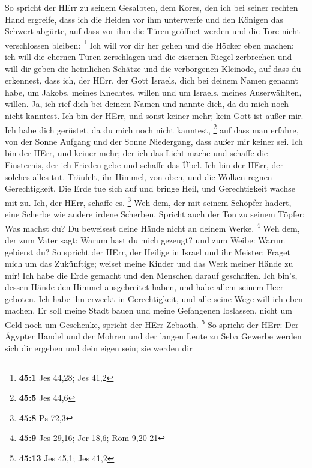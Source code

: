  So spricht der HErr zu seinem Gesalbten, dem Kores, den ich
bei seiner rechten Hand ergreife, dass ich die Heiden vor ihm unterwerfe
und den Königen das Schwert abgürte, auf dass vor ihm die Türen geöffnet
werden und die Tore nicht verschlossen bleiben: \footnote{\textbf{45:1}
  Jes 44,28; Jes 41,2}  Ich will vor dir her gehen und die
Höcker eben machen; ich will die ehernen Türen zerschlagen und die
eisernen Riegel zerbrechen  und will dir geben die
heimlichen Schätze und die verborgenen Kleinode, auf dass du erkennest,
dass ich, der HErr, der Gott Israels, dich bei deinem Namen genannt
habe,  um Jakobs, meines Knechtes, willen und um Israels,
meines Auserwählten, willen. Ja, ich rief dich bei deinem Namen und
nannte dich, da du mich noch nicht kanntest.  Ich bin der
HErr, und sonst keiner mehr; kein Gott ist außer mir. Ich habe dich
gerüstet, da du mich noch nicht kanntest, \footnote{\textbf{45:5} Jes
  44,6}  auf dass man erfahre, von der Sonne Aufgang und der
Sonne Niedergang, dass außer mir keiner sei. Ich bin der HErr, und
keiner mehr;  der ich das Licht mache und schaffe die
Finsternis, der ich Frieden gebe und schaffe das Übel. Ich bin der HErr,
der solches alles tut.  Träufelt, ihr Himmel, von oben, und
die Wolken regnen Gerechtigkeit. Die Erde tue sich auf und bringe Heil,
und Gerechtigkeit wachse mit zu. Ich, der HErr, schaffe es. \footnote{\textbf{45:8}
  Ps 72,3}  Weh dem, der mit seinem Schöpfer hadert, eine
Scherbe wie andere irdene Scherben. Spricht auch der Ton zu seinem
Töpfer: Was machst du? Du beweisest deine Hände nicht an deinem Werke.
\footnote{\textbf{45:9} Jes 29,16; Jer 18,6; Röm 9,20-21} 
Weh dem, der zum Vater sagt: Warum hast du mich gezeugt? und zum Weibe:
Warum gebierst du?  So spricht der HErr, der Heilige in
Israel und ihr Meister: Fraget mich um das Zukünftige; weiset meine
Kinder und das Werk meiner Hände zu mir!  Ich habe die Erde
gemacht und den Menschen darauf geschaffen. Ich bin's, dessen Hände den
Himmel ausgebreitet haben, und habe allem seinem Heer geboten.
 Ich habe ihn erweckt in Gerechtigkeit, und alle seine Wege
will ich eben machen. Er soll meine Stadt bauen und meine Gefangenen
loslassen, nicht um Geld noch um Geschenke, spricht der HErr Zebaoth.
\footnote{\textbf{45:13} Jes 45,1; Jes 41,2}  So spricht
der HErr: Der Ägypter Handel und der Mohren und der langen Leute zu Seba
Gewerbe werden sich dir ergeben und dein eigen sein; sie werden dir
